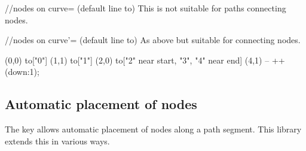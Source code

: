 \begin{multicols}{2}
\begin{stylekey}{/\tikzext/nodes on curve= (default line to)}
This is not suitable for paths connecting nodes.
\end{stylekey}

\begin{stylekey}{/\tikzext/nodes on curve'= (default line to)}
As above but suitable for connecting nodes.
\end{stylekey}

\begin{codeexample}[preamble=\usetikzlibrary{ext.nodes, intersections, quotes, spath3}]
\end{codeexample}
\begin{codeexample}[preamble=\usetikzlibrary{ext.nodes, intersections, quotes, spath3}]
\tikz[inner sep=.15em, circle, nodes={draw, green}, sloped, ultra thick]
  \draw[->, ext/nodes on curve=bend left] (0,0) to["0"] (1,1)
                                                to["1"] (2,0)
                  to["2" near start, "3", "4" near end] (4,1)
                                                -- ++(down:1);
\end{codeexample}
\newcolumn

\subsection{Automatic placement of nodes}
The  key allows automatic placement of
nodes along a path segment.
This library extends this in various ways.


\end{multicols}
